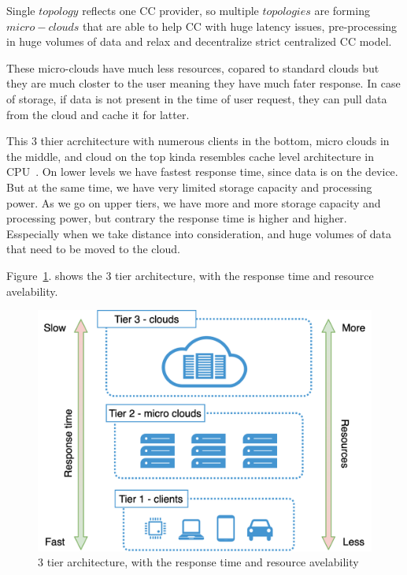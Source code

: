 Single $topology$ reflects one CC provider, so multiple $topologies$ are forming $micro-clouds$ that are able to help CC with huge latency issues, pre-processing in huge volumes of data and relax and decentralize strict centralized CC model.

These micro-clouds have much less resources, copared to standard clouds but they are much closter to the user meaning they have much fater response. In case of storage, if data is not present in the time of user request, they can pull data from the cloud and cache it for latter.

This 3 thier acrchitecture with numerous clients in the bottom, micro clouds in the middle, and cloud on the top kinda resembles cache level architecture in CPU~\cite{FarshinRMK19}. On lower levels we have fastest response time, since data is on the device. But at the same time, we have very limited storage capacity and processing power. As we go on upper tiers, we have more and more storage capacity and processing power, but contrary the response time is higher and higher.  Esspecially when we take distance into consideration, and huge volumes of data that need to be moved to the cloud.

Figure~\ref{fig:fig9}. shows the 3 tier architecture, with the response time and resource avelability.

\begin{figure}[H]
	\includegraphics[width=\linewidth]{images/Figure9}
	\vspace{-0.7cm}
	\caption{3 tier architecture, with the response time and resource avelability}
	\label{fig:fig9}
\end{figure}

